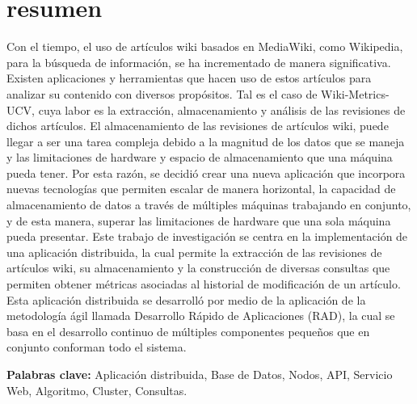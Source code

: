 \section*{resumen}

Con el tiempo, el uso de artículos wiki basados en MediaWiki,
como Wikipedia, para la búsqueda de información, se ha incrementado de
manera significativa.
Existen aplicaciones y herramientas que hacen uso de estos artículos
para analizar su contenido con diversos propósitos.
Tal es el caso de Wiki-Metrics-UCV, cuya labor es la extracción,
almacenamiento y análisis de las revisiones de dichos artículos.
El almacenamiento de las revisiones de artículos wiki,
puede llegar a ser una tarea compleja debido a la magnitud de los datos que se maneja y las limitaciones de hardware y espacio de almacenamiento que una máquina pueda tener.
Por esta razón, se decidió crear una nueva aplicación que incorpora
nuevas tecnologías que permiten escalar de manera horizontal, la capacidad
de almacenamiento de datos a través de múltiples máquinas trabajando en conjunto, y de esta manera,
superar las limitaciones de hardware que una sola máquina pueda presentar.
Este trabajo de investigación se centra en la implementación de una aplicación distribuida,
la cual permite la extracción de las revisiones de artículos wiki, su almacenamiento y la
construcción de diversas consultas que permiten obtener métricas asociadas al historial
de modificación de un artículo.
Esta aplicación distribuida se desarrolló por medio de la aplicación de la metodología
ágil llamada Desarrollo Rápido de Aplicaciones (RAD), la cual se basa en el desarrollo
continuo de múltiples componentes pequeños que en conjunto conforman todo el sistema.

\textbf{Palabras clave:} Aplicación distribuida, Base de Datos, Nodos, API, Servicio Web, Algoritmo, Cluster, Consultas.
